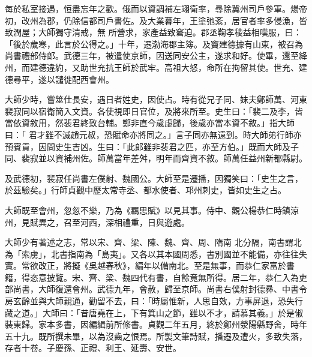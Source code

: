\begin{pinyinscope}
 每於私室接遇，恒盡忘年之歡。俄而以資調補左翊衛率，尋除冀州司戶參軍。煬帝初，改州為郡，仍除信都司戶書佐。及大業暮年，王塗弛紊，居官者率多侵漁，皆致潤屋；大師獨守清戒，無
 所營求，家產益致窘迫。郡丞鞠孝稜益相嘆服，曰：「後於歲寒，此言於公得之。」十年，遷渤海郡主簿。及竇建德據有山東，被召為尚書禮部侍郎。武德三年，被遣使京師，因送同安公主，遂求和好。使畢，還至絳州，而建德違約，又助世充抗王師於武牢。高祖大怒，命所在拘留其使。世充、建德尋平，遂以譴徙配西會州。



 大師少時，嘗筮仕長安，遇日者姓史，因使占。時有從兄子同、妹夫鄭師萬、河東裴寂同以宿衛簡入文資。各使視即日官位，及將來所至。史生曰：「裴二及李，皆當依資敘用，然裴君終致台輔。鄭非直今歲虛歸，後歲亦當本資不敘。」指大師曰：「
 君才雖不滅趙元叔，恐賦命亦將同之。」言子同亦無遠到。時大師弟行師亦預賓貢，因問史生吉凶。生曰：「此郎雖非裴君之匹，亦至方伯。」既而大師及子同、裴寂並以資補州佐。師萬當年差舛，明年而齊資不敘。師萬任益州新都縣尉。



 及武德初，裴寂任尚書左僕射、魏國公。大師至是遷播，因獨笑曰：「史生之言，於茲驗矣。」行師貞觀中歷太常寺丞、都水使者、邛州刺史，皆如史生之占。



 大師既至會州，忽忽不樂，乃為《羈思賦》以見其事。侍中、觀公楊恭仁時鎮涼州，見賦異之，召至河西，深相禮重，日與遊處。



 大師少有著述之志，常以宋、齊、梁、陳、魏、齊、周、隋南
 北分隔，南書謂北為「索虜」，北書指南為「島夷」。又各以其本國周悉，書別國並不能備，亦往往失實。常欲改正，將擬《吳越春秋》，編年以備南北。至是無事，而恭仁家富於書籍，得恣意披覽。宋、齊、梁、魏四代有書，自餘竟無所得。居二年，恭仁入為吏部尚書，大師復還會州。武德九年，會赦，歸至京師。尚書右僕射封德彞、中書令房玄齡並與大師親通，勸留不去，曰：「時屬惟新，人思自效，方事屏退，恐失行藏之道。」大師曰：「昔唐堯在上，下有箕山之節，雖以不才，請慕其義。」於是俶裝東歸。家本多書，因編緝前所修書。貞觀二年五月，終於鄭州滎陽縣野舍，時年
 五十九。既所撰未畢，以為沒齒之恨焉。所製文筆詩賦，播遷及遭火，多致失落，存者十卷。子慶孫、正禮、利王、延壽、安世。




\end{pinyinscope}
